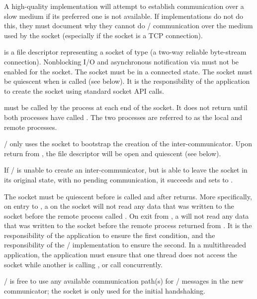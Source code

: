 \begin{implementors}
A high-quality implementation will attempt to establish
communication over a slow medium if its preferred one
is not available.
If implementations do not do this, they must document
why they cannot do \MPI/ communication over the medium
used by the socket (especially if the socket is a TCP
connection).
\end{implementors}


 is a file descriptor representing a socket of type
 (a two-way reliable byte-stream connection).
Nonblocking I/O and asynchronous notification via 
must not be enabled for the socket. The socket must be in a connected
state.  The socket must be quiescent when
 is called (see below). It is the responsibility
of the application to create the socket using standard socket API
calls.

 must be called by the process at each end of the
socket. It does not return until both processes have called
. The two processes are referred to as the local
and remote processes.

\MPI/ only uses the socket to bootstrap the creation of the inter-communicator.
Upon return from , the
file descriptor will be open and quiescent (see below).

If \MPI/ is unable to create an inter-communicator, but
is able to leave the socket in its original state, with no
pending communication, it succeeds and
sets  to .

The socket must be quiescent before
 is called and
after  returns. More specifically, on entry to
, a  on the socket will not read any data
that was written to the socket before the remote process called
. On exit from , a 
will not read any data that was written to the socket before the
remote process returned from . It is the
responsibility of the application to ensure the first condition, and
the responsibility of the \MPI/ implementation to ensure the second.
In a multithreaded application, the application must ensure that
one thread does not access the socket while another is calling
, or call  concurrently.

\begin{implementors}
\MPI/ is free to use any available communication path(s) for \MPI/
messages in the new communicator; the socket is only used for the
initial handshaking.
\end{implementors}

